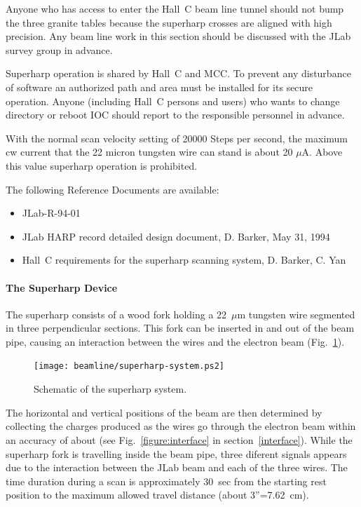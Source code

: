 Anyone who has access to enter the Hall~C beam line tunnel should
not bump the three granite tables because the superharp
crosses are aligned with high precision. Any beam line work in this
section should be discussed with the JLab survey group in advance.

Superharp operation is shared by Hall~C and MCC. To prevent any
disturbance of software an authorized path and area must be
installed for its secure operation. Anyone (including Hall~C persons
and users) who wants to change directory or reboot IOC should
report to the responsible personnel
in advance.

With the normal scan velocity setting of 20000 Steps per second, the
maximum cw current that the 22 micron tungsten wire can stand is about
20 $\mu$A. Above this value superharp operation is prohibited.

The following Reference Documents are available:
\begin{itemize}
\item{JLab-R-94-01}
\item{JLab HARP record detailed design document, D. Barker, May 31, 1994}
\item{Hall~C requirements for the superharp scanning system, D.
Barker, C. Yan}
\end{itemize}


\paragraph{The Superharp Device}\label{system}

The superharp consists of a wood fork holding a 22~$\mu$m tungsten wire segmented in three
perpendicular sections. This fork can be inserted in and out of the beam pipe, causing an
interaction between the wires and the electron beam (Fig.~\ref{figure:superharp}).


\begin{figure}[!hbt]
\begin{center}
\texttt{[image: beamline/superharp-system.ps2]}
\caption{Schematic of the superharp system.}
\label{figure:superharp}
\end{center}
\end{figure}

The horizontal and vertical positions of the beam are then determined by collecting the charges
produced as the wires go through the electron beam within an accuracy of about 
(see Fig.~\ref{figure:interface} in section~\ref{interface}). While the superharp fork
is travelling inside the beam pipe, three diferent signals appears due to the interaction
between the JLab beam and each of the three wires. The time duration during a scan is
approximately 30~sec from the starting rest position to the maximum allowed travel distance
(about 3''=7.62~cm).


